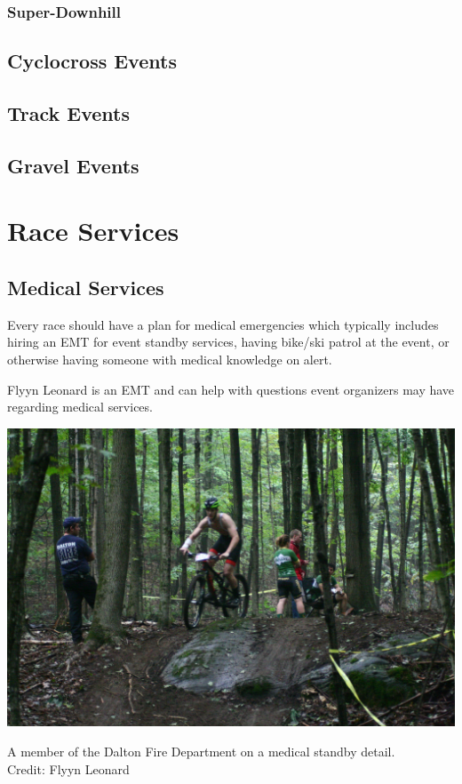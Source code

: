 \documentclass[
  letterpaper, %
  fontsize=10pt, %
  twoside=true,
  chapterentrydots=true, %
  numbers=noenddot,
  fontmethod=tex,
]{kaobook}
\begin{document}
\subsection{Super-Downhill}

\section{Cyclocross Events}

\section{Track Events}

\section{Gravel Events}

\setchapterpreamble[u]{\margintoc}
\chapter{Race Services}

\section{Medical Services}

Every race should have a plan for medical emergencies
which typically includes hiring an EMT %
for event standby services, %
having bike/ski patrol at the event,
or otherwise having someone with medical knowledge on alert.

\begin{kaobox}[title=Local EMT Knowledge]
Flyyn Leonard %
is an EMT
and can help with questions event organizers may have
regarding medical services.
\end{kaobox}

\begin{marginfigure}
\includegraphics{IMG_5836.jpg}
\caption[Medical Standby]{A member of the Dalton Fire Department on a medical standby detail.\\
          Credit: Flyyn Leonard}
\end{marginfigure}
\end{document}
